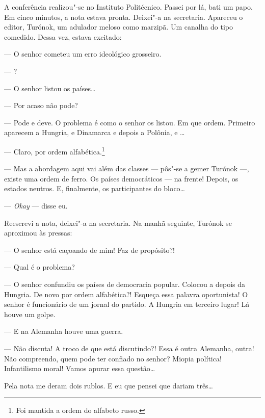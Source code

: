 A conferência realizou"-se no Instituto Politécnico. Passei por lá, bati
um papo. Em cinco minutos, a nota estava pronta. Deixei"-a na secretaria.
Apareceu o editor, Turónok, um adulador meloso como marzipã. Um canalha
do tipo comedido. Dessa vez, estava excitado:

--- O senhor cometeu um erro ideológico grosseiro.

--- ?

--- O senhor listou os países\ldots{}

--- Por acaso não pode?

--- Pode e deve. O problema é como o senhor os listou. Em que ordem.
Primeiro aparecem a Hungria,  e Dinamarca e depois a Polônia,  e
\ldots{}

--- Claro, por ordem alfabética.\footnote{Foi mantida a ordem do
  alfabeto russo.}

--- Mas a abordagem aqui vai além das classes --- pôs"-se a gemer Turónok
---, existe uma ordem de ferro. Os países democráticos --- na frente!
Depois, os estados neutros. E, finalmente, os participantes do bloco\ldots{}

--- \emph{Okay} --- disse eu.

Reescrevi a nota, deixei"-a na secretaria. Na manhã seguinte, Turónok se
aproximou às pressas:

--- O senhor está caçoando de mim! Faz de propósito?!

--- Qual é o problema?

--- O senhor confundiu os países de democracia popular. Colocou a 
depois da Hungria. De novo por ordem alfabética?! Esqueça essa palavra
oportunista! O senhor é funcionário de um jornal do partido. A Hungria
em terceiro lugar! Lá houve um golpe.

--- E na Alemanha houve uma guerra.

--- Não discuta! A troco de que está discutindo?! Essa é outra Alemanha,
outra! Não compreendo, quem pode ter confiado no senhor? Miopia
política! Infantilismo moral! Vamos apurar essa questão\ldots{}

Pela nota me deram dois rublos. E eu que pensei que dariam três\ldots{}

\movetooddpage
\begin{center}
{}
\end{center}

